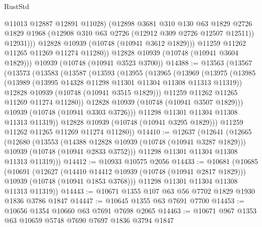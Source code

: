 \begin{lexlean}{RustStd}
\begin{coremodule}
                  @11013
                  @12887
                  @12891
                  @11028)
                (@12898
                  @3681
                  @310
                  @130
                  @63
                  @1829
                  @2726
                  @1829
                  @1968
                  (@12908 @310 @63 @2726 (@12912 @309 @2726 @12507 @12511))
                  @12931)))
            @12828
            @10939
            (@10748 (@10941 @3612 @1829)))
          @11259
          @11262
          @11265
          @11269
          @11274
          @11280))
      @12828
      @10939
      (@10748 (@10941 @3604 @1829)))
    @10939
    (@10748 (@10941 @3523 @3700))
@14388 := @13563
    (@13567
      (@13573
        (@13583
          (@13587
            (@13593
              (@13955
                (@13965
                  (@13969
                    (@13975
                      (@13985
                        (@13989 (@13995 @14328 @11298 @11301 @11304 @11308 @11313 @11319))
                        @12828
                        @10939
                        (@10748 (@10941 @3515 @1829)))
                      @11259
                      @11262
                      @11265
                      @11269
                      @11274
                      @11280))
                  @12828
                  @10939
                  (@10748 (@10941 @3507 @1829)))
                @10939
                (@10748 (@10941 @3303 @3726)))
              @11298
              @11301
              @11304
              @11308
              @11313
              @11319))
          @12828
          @10939
          (@10748 (@10941 @3295 @1829)))
        @11259
        @11262
        @11265
        @11269
        @11274
        @11280))
@14410 := @12637
    (@12641
      (@12665
        (@12680
          (@13553
            (@14388 @12828 @10939 (@10748 (@10941 @3287 @1829)))
            @10939
            (@10748 (@10941 @2833 @3752)))
          @11298
          @11301
          @11304
          @11308
          @11313
          @11319)))
@14412 := @10933 @10575 @2056
@14433 := @10681
    (@10685
      (@10691
        (@12627
          (@14410 @14412 @10939 (@10748 (@10941 @2817 @1829)))
          @10939
          (@10748 (@10941 @1853 @3768)))
        @11298
        @11301
        @11304
        @11308
        @11313
        @11319))
@14443 := @10671 @1355 @107 @63 @56 @7702 @1829 @1930 @1836 @3786 @1847
@14447 := @10645 @1355 @63 @7691 @7700
@14453 := @10656 @1354 @10660 @63 @7691 @7698 @2065
@14463 := @10671 @967 @1353 @63 @10659 @5748 @7690 @7697 @1836 @3794 @1847

\end{coremodule}
\end{lexlean}

